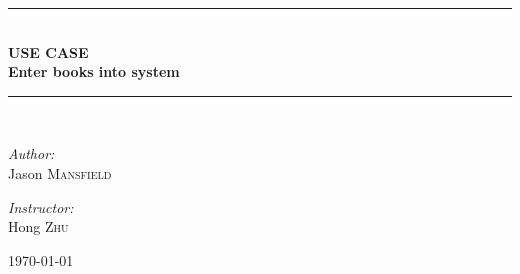 \documentclass[11pt,a4paper]{article}
\newcommand{\HRule}{\rule{\linewidth}{0.5mm}}
\begin{document}
\begin{titlepage}
\begin{center}
\HRule \\[0.4cm]
{ \huge \bfseries USE CASE}\\[0.4cm]
{ \huge \bfseries Enter books into system}\\[0.4cm]
\HRule \\[1.5cm]


\begin{minipage}{0.4\textwidth}
\begin{flushleft} \large
\emph{Author:}\\
Jason \textsc{Mansfield}
\end{flushleft}
\end{minipage}
\begin{minipage}{0.4\textwidth}
\begin{flushright} \large
\emph{Instructor:} \\
Hong \textsc{Zhu}
\end{flushright}
\end{minipage}
\vfill
{\large \today}
\end{center}
\end{titlepage}
\tableofcontents
\end{document}
